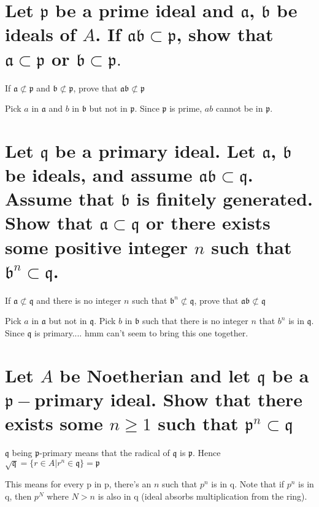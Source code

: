 \documentclass{article}
\begin{document}
\section{Let $\mathfrak{p}$ be a prime ideal and $\mathfrak{a}$, $\mathfrak{b}$ be ideals of $A$. If $\mathfrak{a b} \subset \mathfrak{p}$, show that $\mathfrak{a} \subset \mathfrak{p}$ or $\mathfrak{b} \subset \mathfrak{p}.$}

If $\mathfrak{a} \not\subset \mathfrak{p}$ and $\mathfrak{b} \not\subset \mathfrak{p}$, prove that $\mathfrak{ab} \not\subset \mathfrak{p}$

Pick $a$ in $\mathfrak{a}$ and $b$ in $\mathfrak{b}$ but not in $\mathfrak{p}$. Since $\mathfrak{p}$ is prime, $ab$ cannot be in $\mathfrak{p}$.


\section{Let $\mathfrak{q}$ be a primary ideal. Let $\mathfrak{a}$, $\mathfrak{b}$ be ideals, and assume $\mathfrak{ab} \subset \mathfrak{q}$. Assume that $\mathfrak{b}$ is finitely generated. Show that $\mathfrak{a} \subset  \mathfrak{q}$ or there exists some positive integer $n$ such that $\mathfrak{b}^n \subset \mathfrak{q}$.}

If $\mathfrak{a} \not\subset \mathfrak{q}$ and there is no integer $n$ such that $\mathfrak{b}^n \not\subset \mathfrak{q}$, prove that $\mathfrak{ab} \not\subset \mathfrak{q}$

Pick $a$ in $\mathfrak{a}$ but not in $\mathfrak{q}$. Pick $b$ in $\mathfrak{b}$ such that there is no integer $n$ that $b^n$ is in $\mathfrak{q}$. Since $\mathfrak{q}$ is primary.... hmm can't seem to bring this one together.

\section{Let $A$ be Noetherian and let $\mathfrak{q}$ be a $\mathfrak{p}-$primary ideal. Show that there exists some $n \ge 1$ such that $\mathfrak{p}^n \subset \mathfrak{q}$}

$\mathfrak{q}$ being $\mathfrak{p}$-primary means that the radical of $\mathfrak{q}$ is $\mathfrak{p}$. Hence $\sqrt{\mathfrak{q}} = \{r \in A | r^n \in \mathfrak{q}\} = \mathfrak{p}$

This means for every p in p, there's an $n$ such that $p^n$ is in q. Note that if $p^n$ is in q, then $p^N$ where $N>n$ is also in q (ideal absorbs multiplication from the ring). 
\end{document}
